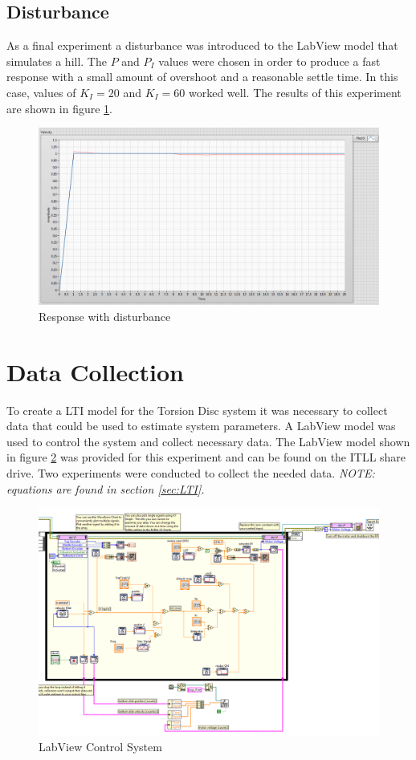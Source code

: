 \documentclass[11pt,titlepage]{article}
\begin{document}
    \subsection{Disturbance} 
        As a final experiment a disturbance was introduced to the LabView model that simulates a hill. The $P$ and $P_I$ values were chosen in order to produce a fast response with a small amount of overshoot and a reasonable settle time. In this case, values of $K_I=20$ and $K_I=60$ worked well. The results of this experiment are shown in figure \ref{fig:resp_dist}.
        \begin{figure}[h!]
            \centering
            \includegraphics[scale=.4]{disturbance}
            \caption{Response with disturbance}
            \label{fig:resp_dist}
        \end{figure}

\section{Data Collection}
    To create a LTI model for the Torsion Disc system it was necessary to collect data that could be used to estimate system parameters. A LabView model was used to control the system and collect necessary data. The LabView model shown in figure \ref{fig:labview_sys} was provided for this experiment and can be found on the ITLL share drive. Two experiments were conducted to collect the needed data. \emph{NOTE: equations are found in section \ref{sec:LTI}.}
    \begin{figure}[h!]
            \centering
            \includegraphics[trim={0 0 10cm 0},clip,scale=0.4]{labviewModel}
            \caption{LabView Control System}
            \label{fig:labview_sys}
    \end{figure}
\end{document}
